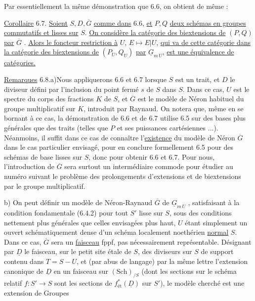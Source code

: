 Par essentiellement la même démonstration que 6.6, on obtient de même :



\underline{Corollaire} 6.7. \underline{Soient} $S,D,\overline{G}$ \underline{comme dans} 6.6, \underline{et} $P,Q$ \underline{deux schémas en groupes commutatifs et lisses sur} $S$. \underline{On considère la catégorie des biextensions de} $(P,Q)$ \underline{par} $\overline{G}$ . \underline{Alors le foncteur restriction à} $U$, $E \longmapsto E|U$, \underline{qui va de cette catégorie dans la catégorie des biextensions de} $(P_U,Q_U)$ \underline{par} $\underline{G}_{m\,U}$, \underline{est une équivalence de catégories.}

\underline{Remarques} 6.8.\quad a)\quad Nous appliquerons 6.6 et 6.7 lorsque $S$ est un trait, et $D$ le diviseur défini par l'inclusion du point fermé $s$ de $S$ dans $S$. Dans ce cas, $U$ est le spectre du corps des fractions $K$ de $S$, et $\overline{G}$ est le modèle de Néron habituel du groupe multiplicatif sur $K$, introduit par Raynaud. On notera que, même en se bornant à ce cas, la démonstration de 6.6 et de 6.7 utilise 6.5 sur des bases plus générales que des traits (telles que $P$ et ses puissances cartésiennes ...). Néanmoins, il suffit dans ce cas de connaître l'\underline{existence} du modèle de Néron $\overline{G}$ dans le cas particulier envisagé, pour en conclure formellement 6.5 pour des schémas de base lisses sur $S$, donc pour obtenir 6.6 et 6.7. Pour nous, l'introduction de $\overline{G}$ sera surtout un intermédiaire commode pour étudier au numéro suivant le problème des prolongements d'extensions et de biextensions par le groupe multiplicatif.

b) On peut définir un modèle de Néron-Raynaud $\overline{G}$ de $\underline{G}_{m\,U}$ , satisfaisant à la condition fondamentale (6.4.2) pour tout $S'$ lisse sur $S$, sous des conditions nettement plus générales que celles envisagées plus haut, $U$ étant simplement un ouvert schématiquement dense d'un schéma localement noethérien \underline{normal} $S$. Dans ce cas, $\overline{G}$ sera un \underline{faisceau} fppf, pas nécessairement représentable. Désignant par $\underline{D}$ le faisceau, sur le petit site étale de $S$, des diviseurs sur $S$ de support contenu
dans $T=S-U$, et (par abus de langage) par la même lettre l'extension canonique de $\underline{D}$ en un faisceau sur $(\mathrm{Sch})_{/S}$ (dont les sections sur le schéma relatif $f:S' \longrightarrow S$ sont les sections de $f^{*}_{\text{ét}}(\underline{D})$ sur $S'$), le modèle cherché est une extension de Groupes


